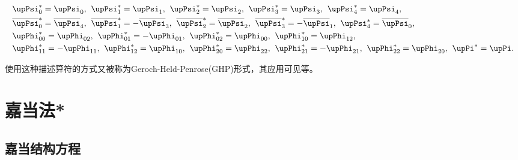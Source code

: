 \begin{equation*}
	\begin{aligned}
		& \upPsi _{0}^{*} =\upPsi _{0} ,\kern+0.4em \upPsi _{1}^{*} =\upPsi _{1} ,\kern+0.4em \upPsi _{2}^{*} =\upPsi _{2} ,\kern+0.4em \upPsi _{3}^{*} =\upPsi _{3} ,\kern+0.4em \upPsi _{4}^{*} =\upPsi _{4} ,\\
		& \overline{\upPsi }_{0}^{*} =\overline{\upPsi }_{4} ,\kern+0.4em \overline{\upPsi }_{1}^{*} =-\overline{\upPsi }_{3} ,\kern+0.4em \overline{\upPsi }_{2}^{*} =\overline{\upPsi }_{2} ,\kern+0.4em \overline{\upPsi }_{3}^{*} =-\overline{\upPsi }_{1} ,\kern+0.4em \upPsi _{4}^{*} =\overline{\upPsi }_{0}\text{, }\\
		& \upPhi _{00}^{*} =\upPhi _{02} ,\kern+0.4em \upPhi _{01}^{*} =-\upPhi _{01} ,\kern+0.4em \upPhi _{02}^{*} =\upPhi _{00} ,\kern+0.4em \upPhi _{10}^{*} =\upPhi _{12}\text{, }\\
		& \upPhi _{11}^{*} =-\upPhi _{11} ,\kern+0.4em \upPhi _{12}^{*} =\upPhi _{10} ,\kern+0.4em \upPhi _{20}^{*} =\upPhi _{22} ,\kern+0.4em \upPhi _{21}^{*} =-\upPhi _{21} ,\kern+0.4em \upPhi _{22}^{*} =\upPhi _{20} ,\kern+0.4em \upPi ^{*} =\upPi .
	\end{aligned}
\end{equation*}

使用这种描述算符的方式又被称为Geroch-Held-Penrose(GHP)形式，其应用可见\parencite{edgar_integration_1997}等。

\section{嘉当法*}
\subsection{嘉当结构方程}

